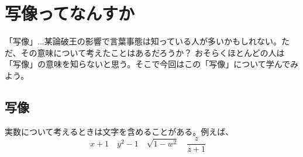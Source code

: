 \documentclass[a4j,dvipdfmx]{jsarticle}
\begin{document}
\section*{写像ってなんすか}
「写像」...某論破王の影響で言葉事態は知っている人が多いかもしれない。ただ、その意味について考えたことはあるだろうか？
おそらくほとんどの人は「写像」の意味を知らないと思う。そこで今回はこの「写像」について学んでみよう。

\subsection{写像}
実数について考えるときは文字を含めることがある。例えば、
\begin{equation}
    x+1\quad y^2-1\quad \sqrt{1-w^2}\quad \frac{z}{z+1}\quad 
\end{equation}
\end{document}
